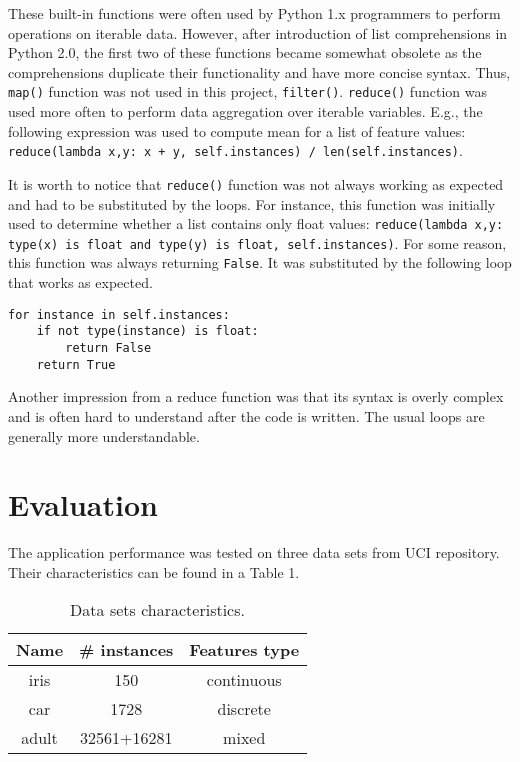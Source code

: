 \documentclass{llncs}
\begin{document}
These built-in functions were often used by Python 1.x programmers to perform operations on iterable data. However, after introduction of list comprehensions in Python 2.0, the first two of these functions became somewhat obsolete as the comprehensions duplicate their functionality and have more concise syntax. Thus, \lstinline{map()} function was not used in this project, \lstinline{filter()}. \lstinline{reduce()} function was used more often to perform data aggregation over iterable variables. E.g., the following expression was used to compute mean for a list of feature values: \lstinline{reduce(lambda x,y: x + y, self.instances) / len(self.instances)}. 

It is worth to notice that \lstinline{reduce()} function was not always working as expected and had to be substituted by the loops. For instance, this function was initially used to determine whether a list contains only float values: \lstinline{reduce(lambda x,y: type(x) is float and type(y) is float, self.instances)}. For some reason, this function was always returning \lstinline{False}. It was substituted by the following loop that works as expected.

\begin{lstlisting}[caption = A loop determining whether the list contains only floats.]
for instance in self.instances:
    if not type(instance) is float:
        return False
    return True
\end{lstlisting}

Another impression from a reduce function was that its syntax is overly complex and is often hard to understand after the code is written. The usual loops are generally more understandable.

\section{Evaluation}

The application performance was tested on three data sets from UCI repository. Their characteristics can be found in a Table 1.

\begin{table}
\begin{center}
  \begin{tabular}{ | c | c | c | }
    \hline
    \textbf{Name} & \textbf{\# instances} & \textbf{Features type} \\ \hline
    iris & 150 & continuous \\ \hline
    car & 1728 & discrete \\ \hline
    adult & 32561+16281 & mixed \\
    \hline
  \end{tabular}
  \caption{Data sets characteristics.}
\end{center}
\end{table}
\end{document}
